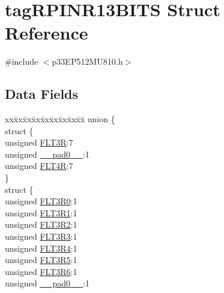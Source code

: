 \hypertarget{structtag_r_p_i_n_r13_b_i_t_s}{}\section{tag\+R\+P\+I\+N\+R13\+B\+I\+TS Struct Reference}
\label{structtag_r_p_i_n_r13_b_i_t_s}


{\ttfamily \#include $<$p33\+E\+P512\+M\+U810.\+h$>$}

\subsection*{Data Fields}
\begin{DoxyCompactItemize}
\item 
\begin{tabbing}
xx\=xx\=xx\=xx\=xx\=xx\=xx\=xx\=xx\=\kill
union \{\\
\>struct \{\\
\>\>unsigned \hyperlink{structtag_r_p_i_n_r13_b_i_t_s_a39b5489db305f1a7c8e9989817ebb207}{FLT3R}:7\\
\>\>unsigned \hyperlink{structtag_r_p_i_n_r13_b_i_t_s_adf71f3d8410c1f1dbbc96680a92c49af}{\_\_pad0\_\_}:1\\
\>\>unsigned \hyperlink{structtag_r_p_i_n_r13_b_i_t_s_a0f7468def72f101d3ab6f321c7d2dca1}{FLT4R}:7\\
\>\} \\
\>struct \{\\
\>\>unsigned \hyperlink{structtag_r_p_i_n_r13_b_i_t_s_ae6800cf0f7dce52bad74a5fe175c2506}{FLT3R0}:1\\
\>\>unsigned \hyperlink{structtag_r_p_i_n_r13_b_i_t_s_aa0fd6559382b7fe3195f0102b1bdbe26}{FLT3R1}:1\\
\>\>unsigned \hyperlink{structtag_r_p_i_n_r13_b_i_t_s_a5238b97b4ea6b4472a71fc70b60486ca}{FLT3R2}:1\\
\>\>unsigned \hyperlink{structtag_r_p_i_n_r13_b_i_t_s_a860ddea860cd64079c207978a2df3c2b}{FLT3R3}:1\\
\>\>unsigned \hyperlink{structtag_r_p_i_n_r13_b_i_t_s_a9be3fa457e36a3c63f04066d507caad5}{FLT3R4}:1\\
\>\>unsigned \hyperlink{structtag_r_p_i_n_r13_b_i_t_s_accae0504cc37827d21f9e7b676e17c8d}{FLT3R5}:1\\
\>\>unsigned \hyperlink{structtag_r_p_i_n_r13_b_i_t_s_af7188e534a06084772ebc0620d680680}{FLT3R6}:1\\
\>\>unsigned \hyperlink{structtag_r_p_i_n_r13_b_i_t_s_adf71f3d8410c1f1dbbc96680a92c49af}{\_\_pad0\_\_}:1\\

\end{tabbing}
\end{DoxyCompactItemize}
